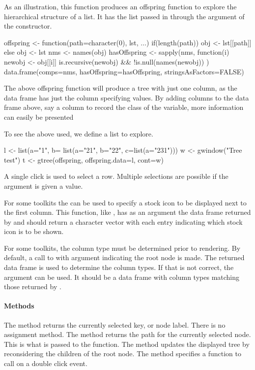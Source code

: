 As an illustration, this function produces an offspring function to
explore the hierarchical structure of a list. It has the list passed
in through the
 argument of the constructor.
\begin{Schunk}
\begin{Sinput}
 offspring <- function(path=character(0), lst, ...) {
   if(length(path))
     obj <- lst[[path]]
   else
       obj <- lst
   nms <- names(obj)
   hasOffspring <- sapply(nms, function(i) {
     newobj <- obj[[i]]
     is.recursive(newobj) && !is.null(names(newobj))
   })
   data.frame(comps=nms, hasOffspring=hasOffspring, 
              stringsAsFactors=FALSE)
 }
\end{Sinput}
\end{Schunk}
%
The above offspring function will produce a tree with just one column,
as the data frame has just the  column specifying
values. By adding columns to the data frame above, say a column to
record the class of the variable, more information can easily be
presented

To see the above used, we define a list to explore.
\begin{Schunk}
\begin{Sinput}
 l <- list(a="1", b= list(a="21", b="22", c=list(a="231")))
 w <- gwindow("Tree test")
 t <- gtree(offspring, offspring.data=l, cont=w)
\end{Sinput}
\end{Schunk}


A single click is used to select a row. Multiple selections are
possible if the  argument is given a
 value.

For some toolkits the  can be used to
specify a stock icon to be displayed next to the first column. This
function, like , has as an argument the data frame
returned by  and should return a character vector with
each entry indicating which stock icon is to be shown.

For some toolkits, the column type must be determined prior to
rendering. By default, a call to  with argument
 indicating the root node is made. The returned data frame
is used to determine the column types. If that is not correct, the
argument  can be used. It should be a data
frame with column types matching those returned by .

\paragraph{Methods}
The  method returns the currently selected key,
or node label. There is no assignment method. The \method{[}{gtree}
method returns the path for the currently selected node. This is what
is passed to the  function.  The
 method updates the displayed tree by
reconsidering the children of the root node.  The method
 specifies a function to call on
a double click event.

